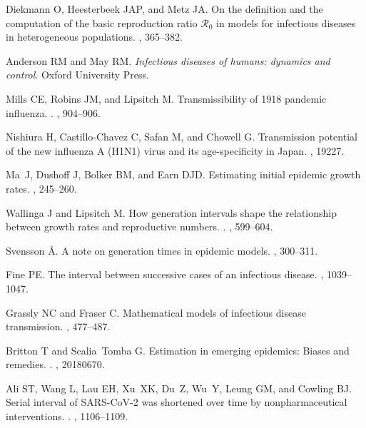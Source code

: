 \documentclass[12pt]{article}
\begin{document}
\begin{thebibliography}{10}
Diekmann O, Heesterbeek JAP, and Metz JA.
 On the definition and the computation of the basic reproduction
  ratio $\mathcal{R}_0$ in models for infectious diseases in heterogeneous
  populations.
, 365--382.

Anderson RM and May RM.
 {\em {Infectious diseases of humans: dynamics and control}}.
\newblock Oxford University Press.

Mills CE, Robins JM, and Lipsitch M.
 Transmissibility of 1918 pandemic influenza.
.
, 904--906.

Nishiura H, Castillo-Chavez C, Safan M, and Chowell G.
 {Transmission potential of the new influenza A (H1N1) virus and
  its age-specificity in Japan}.
, 19227.

Ma~J, Dushoff J, Bolker BM, and Earn DJD.
 Estimating initial epidemic growth rates.
, 245--260.

Wallinga J and Lipsitch M.
 How generation intervals shape the relationship between growth
  rates and reproductive numbers.
.
, 599--604.

Svensson {\AA}.
 A note on generation times in epidemic models.
, 300--311.

Fine PE.
 The interval between successive cases of an infectious disease.
, 1039--1047.

Grassly NC and Fraser C.
 Mathematical models of infectious disease transmission.
, 477--487.

Britton T and Scalia~Tomba G.
 {Estimation in emerging epidemics: Biases and remedies}.
.
, 20180670.

Ali ST, Wang L, Lau EH, Xu~XK, Du~Z, Wu~Y, Leung GM, and Cowling BJ.
 {Serial interval of SARS-CoV-2 was shortened over time by
  nonpharmaceutical interventions}.
.
, 1106--1109.


\end{thebibliography}
\end{document}
